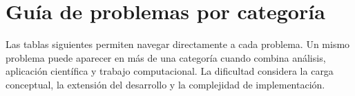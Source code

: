 


\newcommand{\dificultad}[1]{%
  \begingroup
  \ifcase#1\or
    \cellcolor{diffone}\or
    \cellcolor{difftwo}\or
    \cellcolor{diffthree}\or
    \cellcolor{difffour}\or
    \cellcolor{difffive}\or
    \cellcolor{diffsix}\or
    \cellcolor{diffseven}\or
    \cellcolor{diffeight}\or
    \cellcolor{diffnine}\color{white}\or
    \cellcolor{difficult}\color{white}%
  \fi
  \centering\bfseries #1/10
  \endgroup
}

\newcommand{\enlaceproblema}[2]{%
  \hyperref[#1]{\textbf{\ref*{#1}}} &
  \hyperref[#1]{#2}%
}
\newcommand{\filaaplicacion}[4]{%
  \rowcolor{approw}\enlaceproblema{#1}{#2} & #3 & \dificultad{#4}\\\hline
}
\newcommand{\filateorica}[4]{%
  \rowcolor{theoryrow}\enlaceproblema{#1}{#2} & #3 & \dificultad{#4}\\\hline
}
\newcommand{\filacomputacional}[4]{%
  \rowcolor{comprow}\enlaceproblema{#1}{#2} & #3 & \dificultad{#4}\\\hline
}


\section*{Guía de problemas por categoría}
{}

Las tablas siguientes permiten navegar directamente a cada problema. Un mismo
problema puede aparecer en más de una categoría cuando combina análisis,
aplicación científica y trabajo computacional. La dificultad considera la carga
conceptual, la extensión del desarrollo y la complejidad de implementación.


